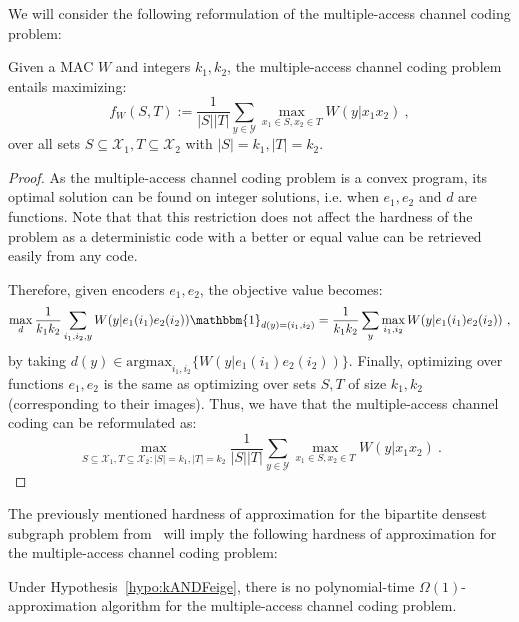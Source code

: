 We will consider the following reformulation of the multiple-access channel coding problem:

\begin{proposition}
  Given a MAC $W$ and integers $k_1,k_2$, the multiple-access channel coding problem entails maximizing:
  \[ f_W(S,T) := \frac{1}{|S||T|}\sum_{y \in \mathcal{Y}} \max_{x_1 \in S, x_2 \in T} W(y|x_1x_2) \ ,\]
  over all sets $S \subseteq \mathcal{X}_1, T \subseteq \mathcal{X}_2$ with $|S|=k_1,|T|=k_2$.
\end{proposition}
\begin{proof}
  As the multiple-access channel coding problem is a convex program, its optimal solution can be found on integer solutions, i.e. when $e_1,e_2$ and $d$ are functions. Note that that this restriction does not affect the hardness of the problem as a deterministic code with a better or equal value can be retrieved easily from any code.

  Therefore, given encoders $e_1,e_2$, the objective value becomes:
  \[ \max_d\frac{1}{k_1k_2}\sum_{i_1,i_2,y}W(y|e_1(i_1)e_2(i_2))\mathbbm{1}_{d(y)=(i_1,i_2)} = \frac{1}{k_1k_2}\sum_y \max_{i_1,i_2} W(y|e_1(i_1)e_2(i_2)) \ ,\]
  by taking $d(y) \in \text{argmax}_{i_1,i_2} \{ W(y|e_1(i_1)e_2(i_2)) \}$. Finally, optimizing over functions $e_1,e_2$ is the same as optimizing over sets $S,T$ of size $k_1,k_2$ (corresponding to their images). Thus, we have that the multiple-access channel coding can be reformulated as: 
  \[ \max_{S \subseteq \mathcal{X}_1, T \subseteq \mathcal{X}_2:|S|=k_1,|T|=k_2} \frac{1}{|S||T|}\sum_{y \in \mathcal{Y}} \max_{x_1 \in S, x_2 \in T} W(y|x_1x_2) \ .\]
\end{proof}

The previously mentioned hardness of approximation for the bipartite densest subgraph problem from~\cite{AAMMW11} will imply the following hardness of approximation for the multiple-access channel coding problem:
\begin{theorem}
  \label{theo:hardnessMAC} 
   Under Hypothesis~\ref{hypo:kANDFeige}, there is no polynomial-time $\Omega(1)$-approximation algorithm for the multiple-access channel coding problem.
\end{theorem}

